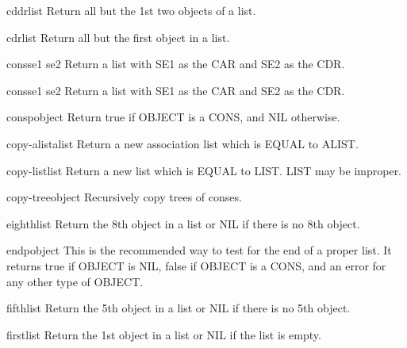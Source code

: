 \begin{accessor}{cddr}{list}{}
  Return all but the 1st two objects of a list.
\end{accessor}

\begin{accessor}{cdr}{list}{}
  Return all but the first object in a list.
\end{accessor}

\begin{function}{cons}{se1 se2}{}
  Return a list with SE1 as the CAR and SE2 as the CDR.
\end{function}

\begin{class}{cons}{se1 se2}{}
  Return a list with SE1 as the CAR and SE2 as the CDR.
\end{class}

\begin{function}{consp}{object}{}
  Return true if OBJECT is a CONS, and NIL otherwise.
\end{function}

\begin{function}{copy-alist}{alist}{}
  Return a new association list which is EQUAL to ALIST.
\end{function}

\begin{function}{copy-list}{list}{}
  Return a new list which is EQUAL to LIST. LIST may be improper.
\end{function}

\begin{function}{copy-tree}{object}{}
  Recursively copy trees of conses.
\end{function}

\begin{accessor}{eighth}{list}{}
  Return the 8th object in a list or NIL if there is no 8th object.
\end{accessor}

\begin{function}{endp}{object}{}
  This is the recommended way to test for the end of a proper list. It
   returns true if OBJECT is NIL, false if OBJECT is a CONS, and an error
   for any other type of OBJECT.
\end{function}

\begin{accessor}{fifth}{list}{}
  Return the 5th object in a list or NIL if there is no 5th object.
\end{accessor}

\begin{accessor}{first}{list}{}
  Return the 1st object in a list or NIL if the list is empty.
\end{accessor}

